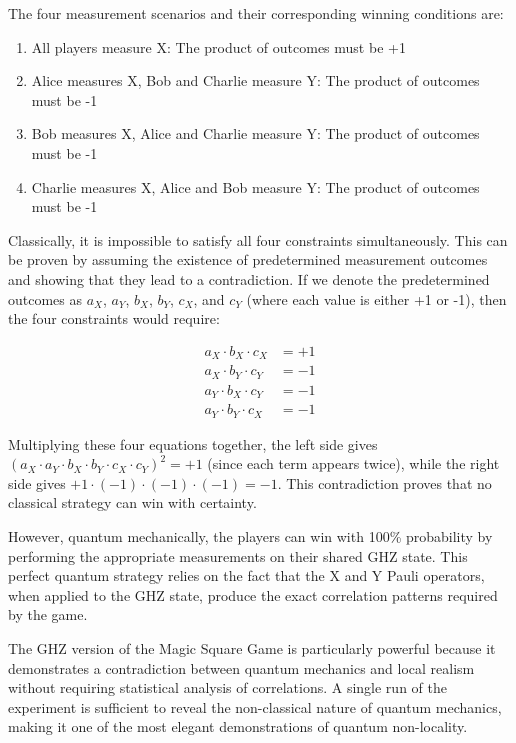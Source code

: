 \documentclass[12pt,a4paper]{article}
\begin{document}
The four measurement scenarios and their corresponding winning conditions are:

\begin{enumerate}
    \item All players measure X: The product of outcomes must be +1
    \item Alice measures X, Bob and Charlie measure Y: The product of outcomes must be -1
    \item Bob measures X, Alice and Charlie measure Y: The product of outcomes must be -1
    \item Charlie measures X, Alice and Bob measure Y: The product of outcomes must be -1
\end{enumerate}

Classically, it is impossible to satisfy all four constraints simultaneously. This can be proven by assuming the existence of predetermined measurement outcomes and showing that they lead to a contradiction. If we denote the predetermined outcomes as $a_X$, $a_Y$, $b_X$, $b_Y$, $c_X$, and $c_Y$ (where each value is either +1 or -1), then the four constraints would require:

\begin{align}
a_X \cdot b_X \cdot c_X &= +1 \\
a_X \cdot b_Y \cdot c_Y &= -1 \\
a_Y \cdot b_X \cdot c_Y &= -1 \\
a_Y \cdot b_Y \cdot c_X &= -1
\end{align}

Multiplying these four equations together, the left side gives $(a_X \cdot a_Y \cdot b_X \cdot b_Y \cdot c_X \cdot c_Y)^2 = +1$ (since each term appears twice), while the right side gives $+1 \cdot (-1) \cdot (-1) \cdot (-1) = -1$. This contradiction proves that no classical strategy can win with certainty.

However, quantum mechanically, the players can win with 100\% probability by performing the appropriate measurements on their shared GHZ state. This perfect quantum strategy relies on the fact that the X and Y Pauli operators, when applied to the GHZ state, produce the exact correlation patterns required by the game.

The GHZ version of the Magic Square Game is particularly powerful because it demonstrates a contradiction between quantum mechanics and local realism without requiring statistical analysis of correlations. A single run of the experiment is sufficient to reveal the non-classical nature of quantum mechanics, making it one of the most elegant demonstrations of quantum non-locality.
\end{document}
